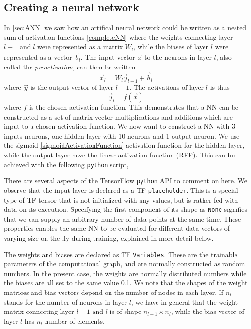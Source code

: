 \documentclass[twoside,english]{uiofysmaster}
\begin{document}
\subsection{Creating a neural network} \label{sec:TensorFlowCreatingNN}
In \autoref{sec:ANN} we saw how an artifical neural network could be written as a nested sum 
of activation functions \eqref{completeNN} where the weights connecting layer $l-1$ and $l$ were represented as
a matrix $W_l$, while the biases of layer $l$ were represented as a vector $\vec{b}_l$. The input vector $\vec{x}$ to 
the neurons in layer $l$, also called the \textit{preactivation}, can then be written
\begin{equation}
 \vec{x}_l = W_l \vec{y}_{l-1}  + \vec{b}_l
 \label{preActivationLayer}
\end{equation}
where $\vec{y}$ is the output vector of layer $l-1$. The activations of layer $l$ is thus
\begin{equation}
 \vec{y}_l = f(\vec{x})
 \label{activationLayer}
\end{equation}
where $f$ is the chosen activation function. This demonstrates that a NN can be constructed 
as a set of matrix-vector multiplications and additions which are input to a chosen activation function. 
We now want to construct a NN with 3 inputs neurons, one hidden layer with 10 neurons and 1 output neuron. 
We use the sigmoid \eqref{sigmoidActivationFunction} activation function for the hidden layer, while 
the output layer have the linear activation function (REF).
This can be achieved with the following \texttt{python} script,

There are several aspects of the TensorFlow \texttt{python} API to comment on here. 
We observe that the input layer is declared as a TF \texttt{placeholder}. This is a special
type of TF tensor that is not initialized with any values, but is rather fed with data on its execution.
Specifying the first component of its shape as \texttt{None} signifies that we can supply an arbitrary 
number of data points at the same time.
These properties enables the same NN to be evaluated for different data vectors of varying size on-the-fly during training, 
explained in more detail below. 

The weights and biases are declared as TF \texttt{Variables}. These are the trainable parameters 
of the computational graph, and are normally constructed as random numbers. In the present case,
the weights are normally distributed numbers while the biases are all set to the same value 0.1. 
We note that the shapes of the weight matrices and bias vectors depend on the number of nodes in each layer.
If $n_l$ stands for the number of neurons in layer $l$, we have in general that the weight matrix connecting
layer $l-1$ and $l$ is of shape $n_{l-1} \times n_l$, while the bias vector of layer $l$ has $n_l$ number of elements. 
\end{document}
